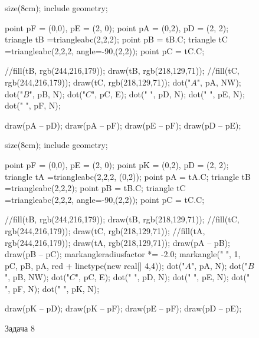 \documentclass{article}
\begin{document}
	\begin{figure}[h]
		\centering
		\begin{minipage}{0.45\textwidth}
			\centering
			\begin{asy}
			size(8cm);
			include geometry;
			
			point pF = (0,0), pE = (2, 0);
			point pA = (0,2), pD = (2, 2);
			triangle tB =triangleabc(2,2,2);
			point pB = tB.C;
			triangle tC =triangleabc(2,2,2, angle=-90,(2,2));
			point pC = tC.C;
			
			//fill(tB, rgb(244,216,179));
			draw(tB, rgb(218,129,71));
			//fill(tC, rgb(244,216,179));
			draw(tC, rgb(218,129,71));
			dot("$A$", pA, NW);
			dot("$B$", pB, N);
			dot("$C$", pC, E);
			dot(" ", pD, N);
			dot(" ", pE, N);
			dot(" ", pF, N);
			
			draw(pA -- pD);
			draw(pA -- pF);
			draw(pE -- pF);
			draw(pD -- pE);
			\end{asy}
			\caption{Задача 7}
		\end{minipage}
		\begin{minipage}{0.45\textwidth}
			\centering
			\begin{asy}
			size(8cm);
			include geometry;
			
			point pF = (0,0), pE = (2, 0);
			point pK = (0,2), pD = (2, 2);
			triangle tA =triangleabc(2,2,2, (0,2));
			point pA = tA.C;
			triangle tB =triangleabc(2,2,2);
			point pB = tB.C;
			triangle tC =triangleabc(2,2,2, angle=-90,(2,2));
			point pC = tC.C;
			
			//fill(tB, rgb(244,216,179));
			draw(tB, rgb(218,129,71));
			//fill(tC, rgb(244,216,179));
			draw(tC, rgb(218,129,71));
			//fill(tA, rgb(244,216,179));
			draw(tA, rgb(218,129,71));
			draw(pA -- pB);
			draw(pB -- pC);
			markangleradiusfactor *= -2.0;
			markangle(" ", 1, pC, pB, pA, red + linetype(new real[] {4,4}));
			dot("$A$", pA, N);
			dot("$B$", pB, NW);
			dot("$C$", pC, E);
			dot(" ", pD, N);
			dot(" ", pE, N);
			dot(" ", pF, N);
			dot(" ", pK, N);
			
			draw(pK -- pD);
			draw(pK -- pF);
			draw(pE -- pF);
			draw(pD -- pE);
			
			\end{asy}
			\caption{Задача 8}
		\end{minipage}
	\end{figure}
	
\end{document}
